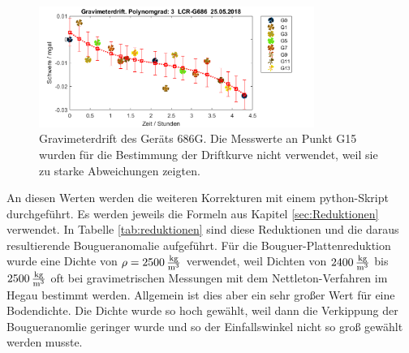 \begin{figure}[!ht]
 \centering
 \includegraphics[width=0.8\textwidth]{fig/G686drift_endgultig}
 \caption[Gravimeterdrift des Geräts 686G]{Gravimeterdrift des Geräts 686G. Die Messwerte an Punkt G15 wurden für die Bestimmung der Driftkurve nicht verwendet, weil sie zu starke Abweichungen zeigten.}
 \label{fig:drift2}
\end{figure}

An diesen Werten werden die weiteren Korrekturen mit einem python-Skript durchgeführt. Es werden jeweils die Formeln aus Kapitel \ref{sec:Reduktionen} verwendet. In Tabelle \ref{tab:reduktionen} sind diese Reduktionen und die daraus resultierende Bougueranomalie aufgeführt. Für die Bouguer-Plattenreduktion wurde eine Dichte von $\rho=2500\,\frac{\mathrm{kg}}{\mathrm{m^3}}$ verwendet, weil Dichten von $2400\,\frac{\mathrm{kg}}{\mathrm{m^3}}$ bis $2500\,\frac{\mathrm{kg}}{\mathrm{m^3}}$ oft bei gravimetrischen Messungen mit dem Nettleton-Verfahren im Hegau bestimmt werden. Allgemein ist dies aber ein sehr großer Wert für eine Bodendichte. Die Dichte wurde so hoch gewählt, weil dann die Verkippung der Bougueranomlie geringer wurde und so der Einfallswinkel nicht so groß gewählt werden musste.



